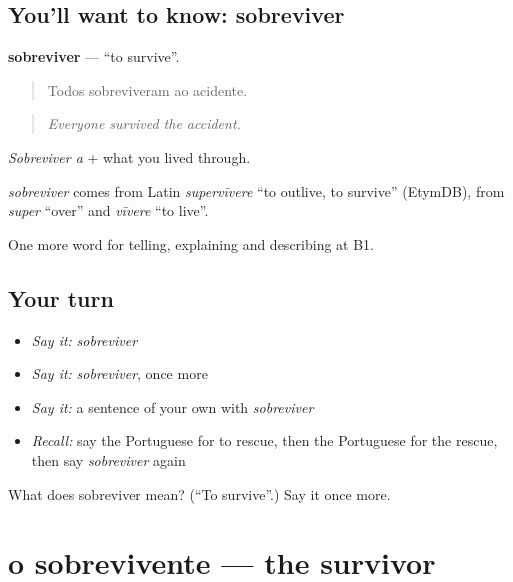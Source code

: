 \subsection*{You'll want to know: sobreviver}
\textbf{sobreviver} — \textquotedblleft{}to survive\textquotedblright{}.

\begin{quote}
Todos sobreviveram ao acidente.
\end{quote}

\begin{quote}
\emph{Everyone survived the accident.}
\end{quote}

\emph{Sobreviver a} + what you lived through.

\begin{cousinweb}
\emph{sobreviver} comes from Latin \emph{supervīvere} \textquotedblleft{}to outlive, to survive\textquotedblright{} (EtymDB), from \emph{super} \textquotedblleft{}over\textquotedblright{} and \emph{vīvere} \textquotedblleft{}to live\textquotedblright{}.
\end{cousinweb}

\begin{grammarlens}[title={What you've built}]
One more word for telling, explaining and describing at B1.
\end{grammarlens}

\subsection*{Your turn}
\begin{itemize}
\raggedright
  \item \emph{Say it:} \emph{sobreviver}
  \item \emph{Say it:} \emph{sobreviver}, once more
  \item \emph{Say it:} a sentence of your own with \emph{sobreviver}
  \item \emph{Recall:} say the Portuguese for to rescue, then the Portuguese for the rescue, then say \emph{sobreviver} again
\end{itemize}

\begin{tcolorbox}[breakable,colback=teal!4,colframe=teal!35!black,title={Before you move on}]
What does sobreviver mean? (\textquotedblleft{}To survive\textquotedblright{}.) Say it once more.
\end{tcolorbox}
\section[o sobrevivente]{o sobrevivente — the survivor}

